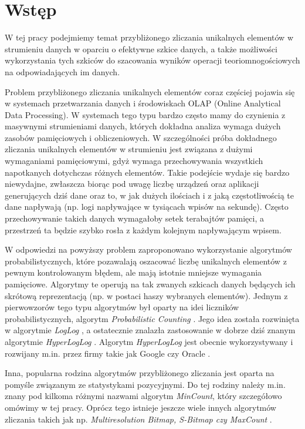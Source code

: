 \chapter{Wstęp}
\thispagestyle{chapterBeginStyle}

W tej pracy podejmiemy temat przybliżonego zliczania unikalnych elementów w strumieniu danych w oparciu o efektywne szkice danych, a także możliwości wykorzystania tych szkiców do szacowania wyników operacji teoriomnogościowych na odpowiadających im danych.

Problem przybliżonego zliczania unikalnych elementów coraz częściej pojawia się w systemach przetwarzania danych i środowiskach OLAP (Online Analytical Data Processing).
W systemach tego typu bardzo często mamy do czynienia z masywnymi strumieniami danych, których dokładna  analiza wymaga dużych zasobów pamięciowych i obliczeniowych. W szczególności próba dokładnego zliczania unikalnych elementów w strumieniu jest związana z dużymi wymaganiami pamięciowymi,  gdyż wymaga przechowywania wszystkich napotkanych dotychczas różnych elementów.
Takie podejście wydaje się bardzo niewydajne,
zwłaszcza biorąc pod uwagę liczbę urządzeń oraz aplikacji generujących dziś dane 
oraz to,  w jak dużych ilościach i z jaką częstotliwością te dane napływają
(np. logi napływające w tysiącach wpisów na sekundę).
Często przechowywanie takich danych wymagałoby
setek terabajtów pamięci, a przestrzeń ta będzie szybko rosła z każdym kolejnym napływającym wpisem.

W odpowiedzi na powyższy problem zaproponowano wykorzystanie algorytmów probabilistycznych, które pozawalają oszacować liczbę unikalnych elementów z pewnym kontrolowanym błędem, ale mają istotnie mniejsze wymagania pamięciowe. Algorytmy te operują na tak zwanych szkicach danych będących ich skrótową reprezentacją (np. w postaci haszy wybranych elementów). Jednym z pierwowzorów tego typu algorytmów był oparty na idei liczników probabilistycznych, algorytm \textit{Probabilistic Counting} \cite{linear}. 
Jego idea została rozwinięta w algorytmie \textit{LogLog} \cite{loglog},
a ostatecznie znalazła zastosowanie w dobrze dziś znanym
algorytmie \textit{HyperLogLog} \cite{hll}.
Algorytm \textit{HyperLogLog} jest obecnie wykorzystywany i rozwijany m.in. przez firmy takie 
jak Google \cite{hllpp} czy Oracle \cite{oracle}.  

Inna, popularna rodzina algorytmów przybliżonego zliczania jest oparta na pomyśle związanym ze statystykami pozycyjnymi. Do tej rodziny należy m.in. znany pod kilkoma różnymi nazwami algorytm \textit{MinCount}, który szczegółowo omówimy w tej pracy. Oprócz tego istnieje jeszcze wiele innych algorytmów zliczania takich jak np. \textit{Multiresolution Bitmap, S-Bitmap czy MaxCount}
\cite{streamed}.

